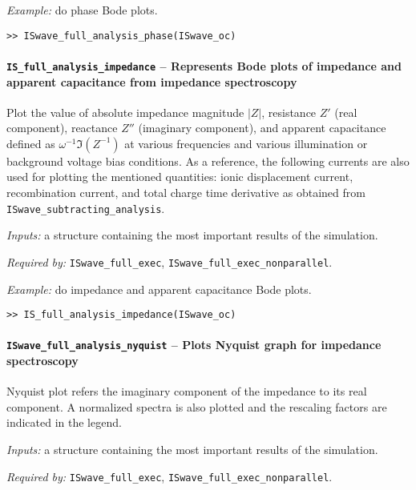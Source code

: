 	\textit{Example:} do phase Bode plots.
	\begin{lstlisting}[style=Matlab-editor]
>> ISwave_full_analysis_phase(ISwave_oc)
				\end{lstlisting}

	\paragraph{\texttt{IS\_full\_analysis\_impedance} -- Represents Bode plots of impedance and apparent capacitance from impedance spectroscopy}
	Plot the value of absolute impedance magnitude $|Z|$, resistance $Z'$ (real component), reactance $Z''$ (imaginary component), and apparent capacitance defined as $\omega^{-1}\Im(Z^{-1})$ at various frequencies and various illumination or background voltage bias conditions.
	As a reference, the following currents are also used for plotting the mentioned quantities: ionic displacement current, recombination current, and total charge time derivative as obtained from \texttt{ISwave\_subtracting\_analysis}.

	\textit{Inputs:} a structure containing the most important results of the simulation.



	\textit{Required by:} \texttt{ISwave\_full\_exec}, \texttt{ISwave\_full\_exec\_nonparallel}.

	\textit{Example:} do impedance and apparent capacitance Bode plots.
	\begin{lstlisting}[style=Matlab-editor]
>> IS_full_analysis_impedance(ISwave_oc)
\end{lstlisting}

	\paragraph{\texttt{ISwave\_full\_analysis\_nyquist} -- Plots Nyquist graph for impedance spectroscopy}
	Nyquist plot refers the imaginary component of the impedance to its real component.
	A normalized spectra is also plotted and the rescaling factors are indicated in the legend.

	\textit{Inputs:} a structure containing the most important results of the simulation.



	\textit{Required by:} \texttt{ISwave\_full\_exec}, \texttt{ISwave\_full\_exec\_nonparallel}.

